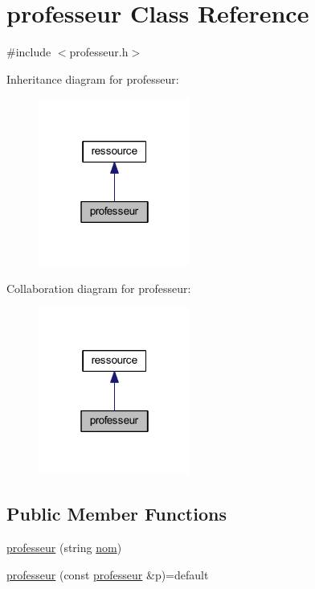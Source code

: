 \hypertarget{classprofesseur}{}\section{professeur Class Reference}
\label{classprofesseur}


{\ttfamily \#include $<$professeur.\+h$>$}



Inheritance diagram for professeur\+:\nopagebreak
\begin{figure}[H]
\begin{center}
\leavevmode
\includegraphics[width=142pt]{classprofesseur__inherit__graph}
\end{center}
\end{figure}


Collaboration diagram for professeur\+:\nopagebreak
\begin{figure}[H]
\begin{center}
\leavevmode
\includegraphics[width=142pt]{classprofesseur__coll__graph}
\end{center}
\end{figure}
\subsection*{Public Member Functions}
\begin{DoxyCompactItemize}
\item 
\hyperlink{classprofesseur_a3cc95d3ac471e633c318782228a8682e}{professeur} (string \hyperlink{classressource_aff712b6d732b3f4091dd29f4349aba85}{nom})
\item 
\hyperlink{classprofesseur_a652526233e701be639ecb40a73161039}{professeur} (const \hyperlink{classprofesseur}{professeur} \&p)=default
\end{DoxyCompactItemize}
